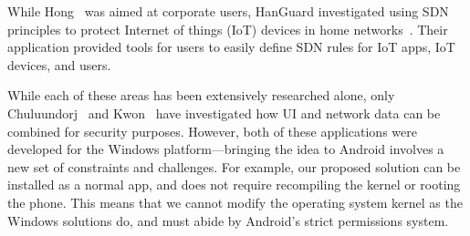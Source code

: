While Hong~\etal \cite{hong2016} was aimed at corporate users, HanGuard
investigated using SDN principles to protect Internet of things (IoT) devices in
home networks~\cite{demetriou2017}. Their application provided tools for users
to easily define SDN rules for IoT apps, IoT devices, and users.

While each of these areas has been extensively researched alone, only
Chuluundorj~\cite{chuluundorj2019} and Kwon~\etal \cite{kwon2011} have
investigated how UI and network data can be combined for security purposes.
However, both of these applications were developed for the Windows
platform---bringing the idea to Android involves a new set of constraints and
challenges. For example, our proposed solution can be installed as a normal app,
and does not require recompiling the kernel or rooting the phone. This means
that we cannot modify the operating system kernel as the Windows solutions do,
and must abide by Android's strict permissions system.

\newpage

